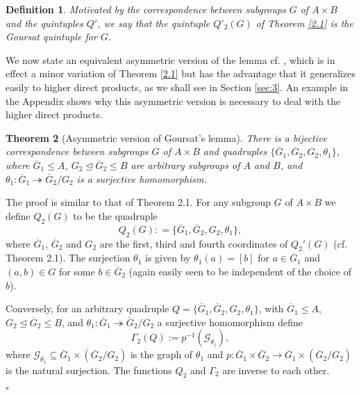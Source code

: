 \documentclass[11pt]{article}
\theoremstyle{change}
\newtheorem{Thm}{Theorem}[section]
\newtheorem{Def}[Thm]{Definition}
\newcommand{\<}{\langle}
\renewcommand{\>}{\rangle}
\newcommand{\Proof} {\noindent{\itshape Proof.\quad }}
\newcommand{\qed}{\quad\hfill$\square$}
\begin{document}
\begin{Def} \label{quint}  Motivated by the correspondence between subgroups $G$ of $A\times B$ and the quintuples $Q'$, we say that the quintuple $Q'_2(G)$ of Theorem \ref{2.1} is the {\it Goursat quintuple} for $G$. \end{Def}

We now state an equivalent asymmetric version of the lemma cf. \cite[Theorem 1.6.1]{Schmidt}, which is in effect a minor variation of Theorem \ref{2.1} but has the advantage that it generalizes easily to higher direct products, as we shall see in Section \ref{sec:3}. An example in the Appendix shows why this asymmetric version is necessary to deal with the higher direct products.

\begin{Thm}[Asymmetric version of Goursat's lemma]\label{2.2}
There is a bijective correspondence between subgroups $G$ of $A\times B$ and quadruples $\{\overline{G}_1,\overline{G}_2,G_2,\theta_1\}$, where $\overline{G}_1\leq A$, $G_2\unlhd \overline{G}_2\leq B$ are arbitrary subgroups of $A$ and $B$, and $\theta_1\colon \overline{G}_1\twoheadrightarrow \overline{G}_2/G_2$ is a surjective homomorphism.
\end{Thm}

\Proof The proof is similar to that of Theorem 2.1.   For any subgroup $G$ of $A\times B$ we define $Q_2(G)$ to be the quadruple
\[  Q_2(G) : =  \{\overline{G}_1,\overline{G}_2,G_2,\theta_1\},\]
where $\overline{G}_1$, $\overline{G}_2$ and $G_2$ are the first, third and fourth coordinates of $Q_2'(G)$ (cf. Theorem 2.1).  The surjection $\theta_1$ is given by $\theta_1(a)=[b]$ for $a\in \overline{G}_1$ and $(a,b)\in G$ for some $b\in \overline{G}_2$ (again easily seen to be independent of the choice of $b$).  

Conversely, for an arbitrary quadruple $Q=\{\overline{G}_1,\overline{G}_2,G_2,\theta_1\}$, with $\overline{G}_1\leq A$, $G_2\unlhd \overline{G}_2\leq B$, and $\theta_1\colon \overline{G}_1\twoheadrightarrow \overline{G}_2/G_2$ a surjective homomorphism define 
\[\Gamma_2(Q):=p^{-1}(\mathcal{G}_{\theta_1}),\]
 where $\mathcal{G}_{\theta_1}\subseteq \overline{G}_1\times \left(\overline{G}_2/G_2\right)$ is the graph of $\theta_1$ and $p\colon \overline{G}_1\times \overline{G}_2\rightarrow \overline{G}_1\times \left(\overline{G}_2/G_2\right)$ is the natural surjection.  The functions $Q_2$ and $\Gamma_2$ are inverse to each other.
 
 \qed
\end{document}
